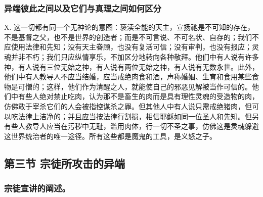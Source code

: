 
\subsubsection{异端彼此之间以及它们与真理之间如何区分}

X. 这一切都有同一个无神论的意图：亵渎全能的天主，宣扬祂是不可知的存在，不是基督之父，也不是世界的创造者；而是不可言说、不可名状、自存的；我们不应使用法律和先知；没有天主眷顾，也没有复活可信；没有审判，也没有报应；灵魂并非不朽；我们只应纵情享乐，不加区分地转向各种敬拜。他们中有人说有许多神，有人说有三位无始之神，有人说有两位无始之神，有人说有无数永世。此外，他们中有人教导人不应当结婚，应当戒绝肉食和酒，声称婚姻、生育和食用某些食物是可憎的；这样，他们作为清醒之人，就能使自己的邪恶见解被当作可信的。他们中有些人绝对禁止吃肉，认为那不是畜生的肉而是具有理性灵魂的受造物的肉，仿佛敢于宰杀它们的人会被指控谋杀之罪。但其他人中有人说只需戒绝猪肉，但可以吃法律上洁净的；并且应当按法律行割损，相信耶稣如同一位圣人和先知。但另有些人教导人应当在污秽中无耻，滥用肉体，行一切不圣之事，仿佛这是灵魂躲避这世界统治者的唯一途径。所有这些都是魔鬼的工具，是义怒之子。\par


\subsection{第三节 宗徒所攻击的异端}


\subsubsection{宗徒宣讲的阐述。}

